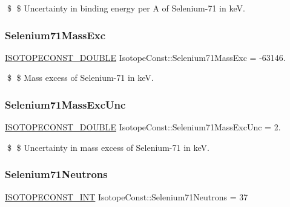 \$ \$ Uncertainty in binding energy per A of Selenium-\/71 in keV. \mbox{\label{group___isotope_const-_selenium-_se71_ga5aeb4b627f3ac5bddd59260a76f943f9}} 
\subsubsection{\texorpdfstring{Selenium71\+Mass\+Exc}{Selenium71MassExc}}
{\footnotesize\ttfamily \mbox{\hyperlink{group___isotope_const-_macros_ga8f45a7272ce02c0b4c65c44636ed719a}{I\+S\+O\+T\+O\+P\+E\+C\+O\+N\+S\+T\+\_\+\+D\+O\+U\+B\+LE}} Isotope\+Const\+::\+Selenium71\+Mass\+Exc = -\/63146.}

\$ \$ Mass excess of Selenium-\/71 in keV. \mbox{\label{group___isotope_const-_selenium-_se71_ga56b060a76f6f3e3de7626c5eb83a3fd3}} 
\subsubsection{\texorpdfstring{Selenium71\+Mass\+Exc\+Unc}{Selenium71MassExcUnc}}
{\footnotesize\ttfamily \mbox{\hyperlink{group___isotope_const-_macros_ga8f45a7272ce02c0b4c65c44636ed719a}{I\+S\+O\+T\+O\+P\+E\+C\+O\+N\+S\+T\+\_\+\+D\+O\+U\+B\+LE}} Isotope\+Const\+::\+Selenium71\+Mass\+Exc\+Unc = 2.}

\$ \$ Uncertainty in mass excess of Selenium-\/71 in keV. \mbox{\label{group___isotope_const-_selenium-_se71_ga84a0c1c8e54724c075a1e27e708b0e3f}} 
\subsubsection{\texorpdfstring{Selenium71\+Neutrons}{Selenium71Neutrons}}
{\footnotesize\ttfamily \mbox{\hyperlink{group___isotope_const-_macros_ga5f18360b3e99483a35c32d789e62621c}{I\+S\+O\+T\+O\+P\+E\+C\+O\+N\+S\+T\+\_\+\+I\+NT}} Isotope\+Const\+::\+Selenium71\+Neutrons = 37}

